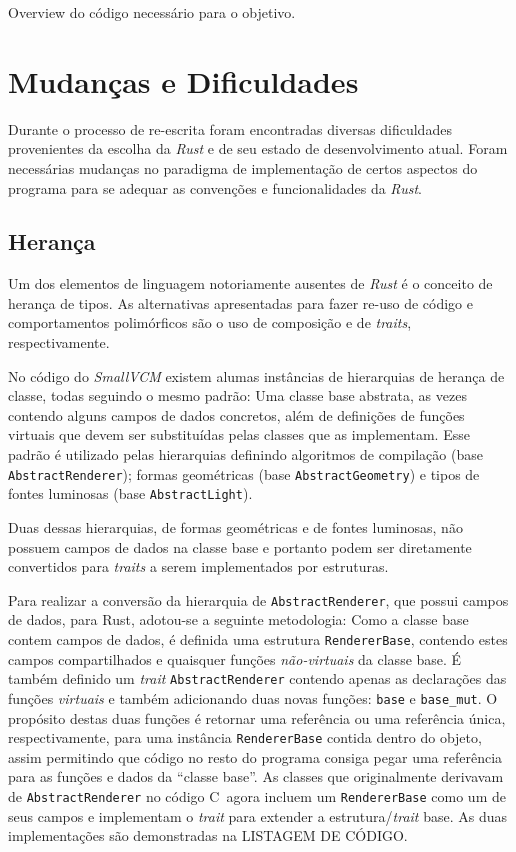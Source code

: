 \documentclass[tg]{mdtufsm}
\def\Cpp{{C\nolinebreak[4]\raisebox{.20ex}{\small\bf++}}}
\newcommand{\todo}[1]{\textsf{\color{red}#1}}
\begin{document}
\todo{Overview do código necessário para o objetivo.}

\section{Mudanças e Dificuldades}

Durante o processo de re-escrita foram encontradas diversas dificuldades provenientes da escolha da \emph{Rust} e de seu estado de desenvolvimento atual. Foram necessárias mudanças no paradigma de implementação de certos aspectos do programa para se adequar as convenções e funcionalidades da \emph{Rust}.

\subsection{Herança}

Um dos elementos de linguagem notoriamente ausentes de \emph{Rust} é o conceito de herança de tipos. As alternativas apresentadas para fazer re-uso de código e comportamentos polimórficos são o uso de composição e de \emph{traits}, respectivamente.

No código do \emph{SmallVCM} existem alumas instâncias de hierarquias de herança de classe, todas seguindo o mesmo padrão: Uma classe base abstrata, as vezes contendo alguns campos de dados concretos, além de definições de funções virtuais que devem ser substituídas pelas classes que as implementam. Esse padrão é utilizado pelas hierarquias definindo algoritmos de compilação (base \texttt{AbstractRenderer}); formas geométricas (base \texttt{AbstractGeometry}) e tipos de fontes luminosas (base \texttt{AbstractLight}).

Duas dessas hierarquias, de formas geométricas e de fontes luminosas, não possuem campos de dados na classe base e portanto podem ser diretamente convertidos para \emph{traits} a serem implementados por estruturas.

Para realizar a conversão da hierarquia de \texttt{AbstractRenderer}, que possui campos de dados, para Rust, adotou-se a seguinte metodologia: Como a classe base contem campos de dados, é definida uma estrutura \texttt{RendererBase}, contendo estes campos compartilhados e quaisquer funções \emph{não-virtuais} da classe base. É também definido um \emph{trait} \texttt{AbstractRenderer} contendo apenas as declarações das funções \emph{virtuais} e também adicionando duas novas funções: \texttt{base} e \texttt{base\_mut}. O propósito destas duas funções é retornar uma referência ou uma referência única, respectivamente, para uma instância \texttt{RendererBase} contida dentro do objeto, assim permitindo que código no resto do programa consiga pegar uma referência para as funções e dados da ``classe base''. As classes que originalmente derivavam de \texttt{AbstractRenderer} no código \Cpp\ agora incluem um \texttt{RendererBase} como um de seus campos e implementam o \emph{trait} para extender a estrutura/\emph{trait} base. As duas implementações são demonstradas na \todo{LISTAGEM DE CÓDIGO}.
\end{document}
